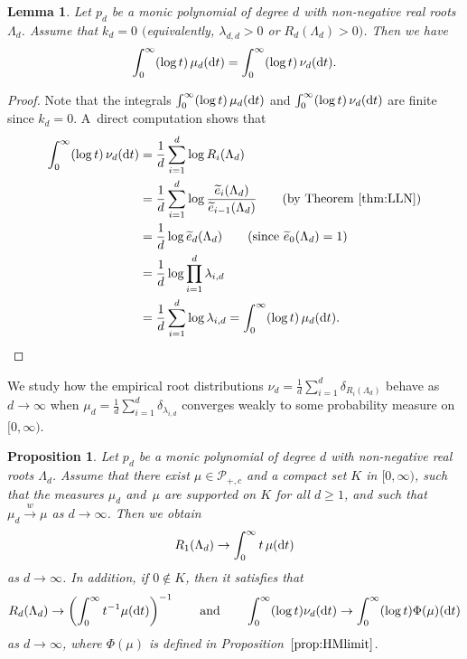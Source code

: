\documentclass[pdftex]{sigma}
\newtheorem{Lemma}[Theorem]{Lemma}
\newtheorem{Proposition}[Theorem]{Proposition}
 { \theoremstyle{definition}
\newtheorem{Definition}[Theorem]{Definition}
\newtheorem{Note}[Theorem]{Note}
\newtheorem{Example}[Theorem]{Example}
\newtheorem{Remark}[Theorem]{Remark}
\newtheorem{Conjecture}[Theorem]{Conjecture}}
\numberwithin{equation}{section}
\newcommand{\calP}{\mathcal{P}}
\begin{document}
\begin{Lemma}\label{lem:log}
Let $p_d$ be a monic polynomial of degree $d$ with non-negative real roots $\Lambda_d$. Assume that $k_d=0$ $($equivalently, $\lambda_{d,d}>0$ or $R_d(\Lambda_d)>0$$)$. Then we have
\begin{align*}
\int_0^\infty (\log t ) \, \mu_d ({\rm d}t) =\int_0^\infty (\log t) \, \nu_d ({\rm d}t).
\end{align*}
\end{Lemma}

\begin{proof}
Note that the integrals $\int_0^\infty (\log t) \, \mu_d({\rm d}t)$ and $\int_0^\infty (\log t) \, \nu_d({\rm d}t)$ are finite since $k_d=0$. A~direct computation shows that
\begin{align*}
\int_0^\infty (\log t) \, \nu_d({\rm d}t) &= \frac{1}{d}\sum_{i=1}^d \log R_i(\Lambda_d)\\
&=\frac{1}{d}\sum_{i=1}^d \log \frac{\widetilde{e}_i(\Lambda_d)}{\widetilde{e}_{i-1}(\Lambda_d)} \qquad \text{(by Theorem \ref{thm:LLN})}\\
&=\frac{1}{d}\log \widetilde{e}_d(\Lambda_d) \qquad \text{(since $\widetilde{e}_0(\Lambda_d)=1$)}\\
&=\frac{1}{d}\log \prod_{i=1}^d \lambda_{i,d}\\
&=\frac{1}{d}\sum_{i=1}^d \log \lambda_{i,d}=\int_0^\infty (\log t)\, \mu_d({\rm d}t).\tag*{\qed}
\end{align*}\renewcommand{\qed}{}
\end{proof}


We study how the empirical root distributions $\nu_d=\frac{1}{d}\sum_{i=1}^d \delta_{R_{i}(\Lambda_d)}$ behave as $d\rightarrow\infty$ when
$\mu_d=\frac{1}{d}\sum_{i=1}^d \delta_{\lambda_{i,d}}$ converges weakly to some probability measure on $[0,\infty)$.

\begin{Proposition}\label{prop:R}
Let $p_d$ be a monic polynomial of degree $d$ with non-negative real roots $\Lambda_d$. Assume that there exist $\mu\in \calP_{+,c}$ and a compact set $K$ in $[0,\infty)$, such that the measures $\mu_d$ and~$\mu$ are supported on $K$ for all $d\ge 1$, and such that $\mu_d \xrightarrow{w} \mu$ as $d\rightarrow\infty$.
Then we obtain
\[
R_1(\Lambda_d)\rightarrow \int_0^\infty t \, \mu({\rm d}t)
\]
as $d\rightarrow\infty$. In addition, if $0\notin K$, then
it satisfies that
\[
R_{d}(\Lambda_d)\rightarrow \left(\int_0^\infty t^{-1} \mu({\rm d}t)\right)^{-1} \qquad \text{and} \qquad
\int_0^\infty (\log t) \nu_d({\rm d}t) \rightarrow \int_0^\infty (\log t) \Phi(\mu)({\rm d}t)
\]
as $d\rightarrow\infty$, where $\Phi(\mu)$ is defined in Proposition~$\ref{prop:HMlimit}$.
\end{Proposition}
\end{document}
